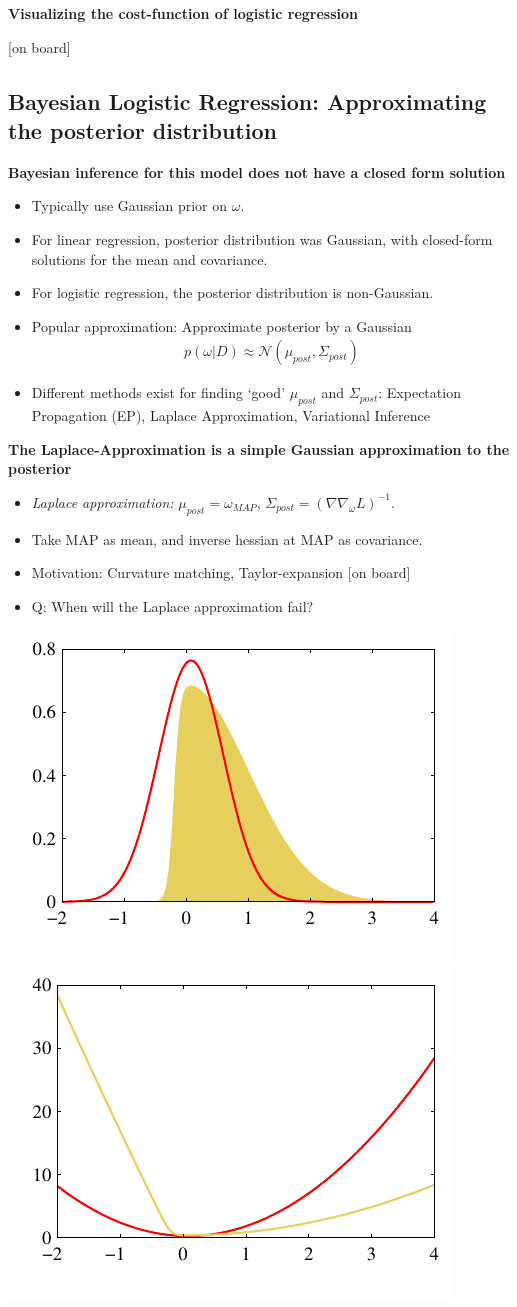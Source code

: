 \textbf{Visualizing the cost-function of logistic regression}

[on board]


\subsection{Bayesian Logistic Regression: Approximating the posterior distribution}
\textbf{Bayesian inference for this model does not have a closed form solution}
\begin{itemize}
\item Typically use Gaussian prior on $\omega$.
\item For linear regression, posterior distribution was Gaussian, with closed-form solutions for the mean and covariance.
\item For logistic regression, the posterior distribution is non-Gaussian.
\item  Popular approximation: Approximate posterior by a Gaussian
\begin{align}
p(\omega|D) \approx \mathcal{N}(\mu_{post}, \Sigma_{post})
\end{align}
\item  Different methods exist for finding `good' $\mu_{post}$ and $\Sigma_{post}$: Expectation Propagation (EP), Laplace Approximation, Variational Inference
\end{itemize}

\textbf{The Laplace-Approximation is a simple Gaussian approximation to the posterior}
\begin{itemize}
\item \emph{Laplace approximation:} $\mu_{post}=\omega_{MAP}$, $\Sigma_{post}=\left(\nabla \nabla_\omega L   \right)^{-1}$. 
\item Take MAP as mean, and inverse hessian at MAP as covariance.
\item  Motivation: Curvature matching, Taylor-expansion [on board]
\item  Q: When will the Laplace approximation fail?
\end{itemize}
\includegraphics[width=.49\textwidth]{./lecture7/Figure414a.pdf}
\includegraphics[width=.49\textwidth]{./lecture7/Figure414b.pdf}


